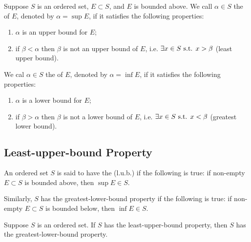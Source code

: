\begin{definition}[Supremum]
Suppose $S$ is an ordered set, $E\subset S$, and $E$ is bounded above. We call $\alpha\in S$ the  of $E$, denoted by $\alpha=\sup E$, if it satisfies the following properties:
\begin{enumerate}[label=(\roman*)]
\item $\alpha$ is an upper bound for $E$;
\item if $\beta<\alpha$ then $\beta$ is not an upper bound of $E$, i.e. $\exists x\in S\text{ s.t. } x>\beta$ (least upper bound).
\end{enumerate}
\end{definition}

\begin{definition}[Infimum]
We cal $\alpha\in S$ the  of $E$, denoted by $\alpha=\inf E$, if it satisfies the following properties:
\begin{enumerate}[label=(\roman*)]
\item $\alpha$ is a lower bound for $E$;
\item if $\beta>\alpha$ then $\beta$ is not a lower bound of $E$, i.e. $\exists x\in S\text{ s.t. } x<\beta$ (greatest lower bound).
\end{enumerate}
\end{definition}

\subsection{Least-upper-bound Property}
\begin{definition}
An ordered set $S$ is said to have the  (l.u.b.) if the following is true: if non-empty $E\subset S$ is bounded above, then $\sup E\in S$.

Similarly, $S$ has the greatest-lower-bound property if the following is true: if non-empty $E\subset S$ is bounded below, then $\inf E\in S$.
\end{definition}

\begin{proposition}
Suppose $S$ is an ordered set. If $S$ has the least-upper-bound property, then $S$ has the greatest-lower-bound property.
\end{proposition}

